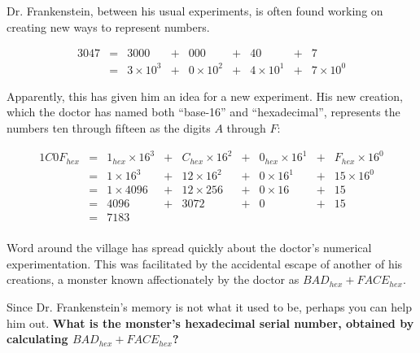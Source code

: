 

Dr. Frankenstein, between his usual experiments,
is often found working on creating new ways to represent numbers.


{\Large
\[
  \begin{array}{rcccccccc}
  3047 & = & 3000 &+& 000 &+& 40 &+& 7 \\
       & = & 3\times10^3 &+& 0\times10^2 &+& 4\times10^1 &+& 7\times10^0
  \end{array}
\]
}

Apparently, this has given him an idea for a new experiment.
 His new creation, which the
doctor has named both ``base-16'' and ``hexadecimal'', represents the numbers
ten through fifteen as the digits \(A\) through \(F\):

{\Large
\[
  \begin{array}{rcccccccc}
  1C0F_{hex} & = & 1_{hex}\times16^3 &+& C_{hex}\times16^2 &+& 0_{hex}\times16^1 &+& F_{hex}\times16^0 \\
             & = & 1\times16^3 &+& 12\times16^2 &+& 0\times16^1 &+& 15\times16^0 \\
             & = & 1\times4096 &+& 12\times256 &+& 0\times16 &+& 15 \\
             & = & 4096 &+& 3072 &+& 0 &+& 15 \\
             & = & 7183\\
  \end{array}
\]
}

Word around the village has spread quickly about the doctor's numerical
experimentation. This was facilitated by the accidental escape of another
of his creations, a monster known affectionately by the doctor as
\(BAD_{hex}+FACE_{hex}\).


Since Dr. Frankenstein's memory is not what it used to be, perhaps you can
help him out. \textbf{What is the monster's hexadecimal serial number, obtained
by calculating \(BAD_{hex}+FACE_{hex}\)?}
